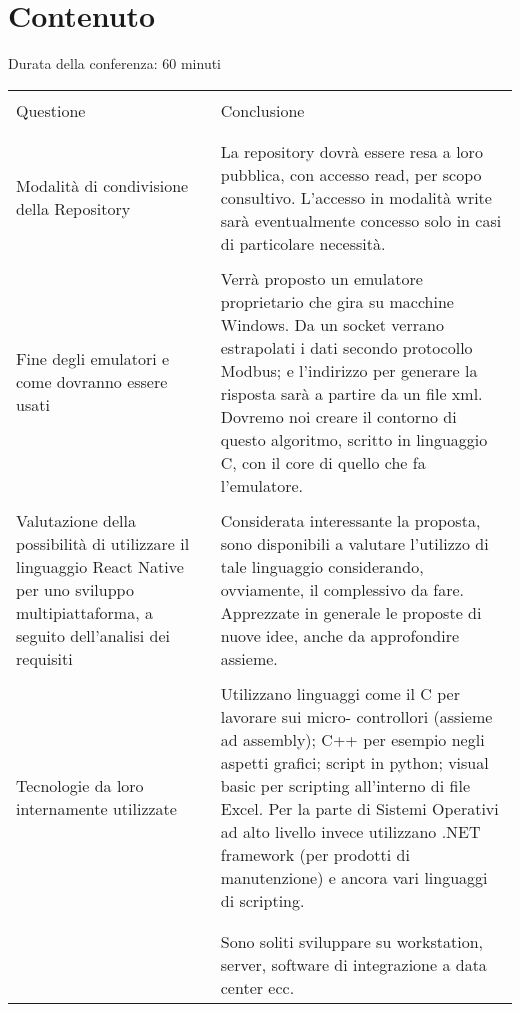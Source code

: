 \section{Contenuto}
Durata della conferenza: 60 minuti
\newline
\begin{longtable}{|p{7cm}|p{8cm}|}
    \hline
    & \\
    Questione & Conclusione\\
    & \\
    \hline
    & \\

    Modalità di condivisione della Repository     
    &
    La repository dovrà essere
    resa a loro pubblica, con
    accesso read, per scopo
    consultivo. L'accesso in
    modalità write sarà
    eventualmente concesso solo
    in casi di particolare necessità.\\

    & \\

    Fine degli emulatori e
    come dovranno essere usati   
    &
    Verrà proposto un emulatore
    proprietario che gira su
    macchine Windows. Da un
    socket verrano estrapolati i
    dati secondo protocollo
    Modbus; e l'indirizzo per
    generare la risposta sarà a
    partire da un file xml. Dovremo
    noi creare il contorno di questo
    algoritmo, scritto in linguaggio
    C, con il core di quello che fa
    l’emulatore.\\

    & \\

    Valutazione della possibilità di utilizzare il
    linguaggio React Native per uno sviluppo
    multipiattaforma, a seguito dell'analisi dei requisiti   
    &
    Considerata interessante la
    proposta, sono disponibili a
    valutare l'utilizzo di tale
    linguaggio considerando, ovviamente, il
    complessivo da fare.
    Apprezzate in generale le
    proposte di nuove idee, anche
    da approfondire assieme.\\

    & \\

    Tecnologie da loro internamente utilizzate   
    &
    Utilizzano linguaggi come il C
    per lavorare sui micro-
    controllori (assieme ad
    assembly); C++ per esempio
    negli aspetti grafici; script in
    python; visual basic per
    scripting all’interno di file
    Excel. Per la parte di Sistemi
    Operativi ad alto livello invece
    utilizzano .NET framework (per
    prodotti di manutenzione) e
    ancora vari linguaggi di
    scripting.\\
    & \\
    \hline
    & \\
    &
    Sono soliti
    sviluppare su workstation,
    server, software di
    integrazione a data
    center ecc.\\
    

\end{longtable}
